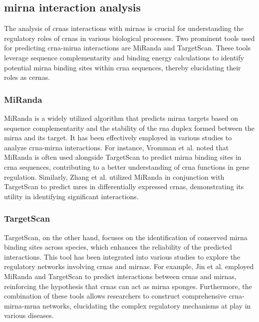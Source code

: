\subsection{\gls{mirna} interaction analysis}
The analysis of \glspl{crna} interactions with \glspl{mirna} is crucial for
understanding the regulatory roles of \glspl{crna} in various biological
processes.
Two prominent tools used for predicting \gls{crna}-\gls{mirna} interactions are
MiRanda and TargetScan.
These tools leverage sequence complementarity and binding energy calculations
to identify potential \gls{mirna} binding sites within \gls{crna} sequences,
thereby elucidating their roles as \glspl{cerna}.

\subsubsection{MiRanda}
MiRanda is a widely utilized algorithm that predicts \gls{mirna} targets based
on sequence complementarity and the stability of the \gls{rna} duplex formed
between the \gls{mirna} and its target.
It has been effectively employed in various studies to analyze
\gls{crna}-\gls{mirna} interactions.
For instance, Vromman et al.
noted that
MiRanda is often used alongside TargetScan to predict \gls{mirna} binding sites
in
\gls{crna} sequences, contributing to a better understanding of \gls{crna}
functions
in gene regulation\supercite{vromman_closing_2021}.
Similarly, Zhang et al.
utilized
MiRanda in conjunction with TargetScan to predict \glspl{mre} in differentially
expressed \glspl{crna}, demonstrating its utility in
identifying significant interactions\supercite{zhang_microarray_2017}.

\subsubsection{TargetScan}
TargetScan, on the other hand, focuses on the identification of conserved
\gls{mirna} binding sites across species, which enhances the reliability of the
predicted interactions.
This tool has been integrated into various studies to explore the regulatory
networks involving \glspl{crna} and \glspl{mirna}.
For example, Jin et al.
employed MiRanda and TargetScan to predict interactions between \glspl{crna}
and
\glspl{mirna}, reinforcing the hypothesis that \glspl{crna} can act as
\gls{mirna}
sponges\supercite{jin_changes_2018}.
Furthermore, the combination of these tools allows researchers to construct
comprehensive \gls{crna}-\gls{mirna}-\gls{mrna} networks, elucidating the
complex regulatory mechanisms at play in various
diseases\supercite{he_construction_2021,zhang_construction_2021}.
